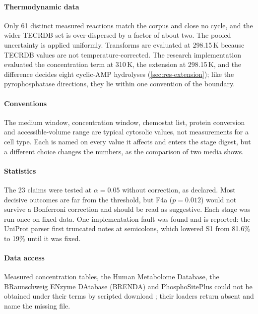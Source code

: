 \documentclass[5p]{elsarticle}
\theoremstyle{definition}
\theoremstyle{plain}
\newcommand{\st}[1]{\textsf{#1}}            %
\begin{document}
\paragraph{Thermodynamic data}
Only 61 distinct measured reactions match the corpus and close no cycle, and the wider TECRDB set is over-dispersed by a factor of about two.
The pooled uncertainty is applied uniformly.
Transforms are evaluated at 298.15\,K because TECRDB values are not temperature-corrected.
The research implementation evaluated the concentration term at 310\,K, the extension at 298.15\,K, and the difference decides eight cyclic-AMP hydrolyses (\cref{sec:res-extension}); like the pyrophosphatase directions, they lie within one convention of the boundary.

\paragraph{Conventions}
The medium window, concentration window, chemostat list, protein conversion and accessible-volume range are typical cytosolic values, not measurements for a cell type.
Each is named on every value it affects and enters the stage digest, but a different choice changes the numbers, as the comparison of two media shows.

\paragraph{Statistics}
The 23 claims were tested at $\alpha=0.05$ without correction, as declared.
Most decisive outcomes are far from the threshold, but F4a ($p=0.012$) would not survive a Bonferroni correction and should be read as suggestive.
Each stage was run once on fixed data.
One implementation fault was found and is reported: the UniProt parser first truncated notes at semicolons, which lowered S1 from 81.6\% to 19\% until it was fixed.

\paragraph{Data access}
Measured concentration tables, the Human Metabolome Database, the BRaunschweig ENzyme DAtabase (BRENDA) and PhosphoSitePlus could not be obtained under their terms by scripted download \citep{park2016concentrations,wishart2022hmdb,chang2021brenda,hornbeck2015psp}; their loaders return \st{absent} and name the missing file.

\end{document}
